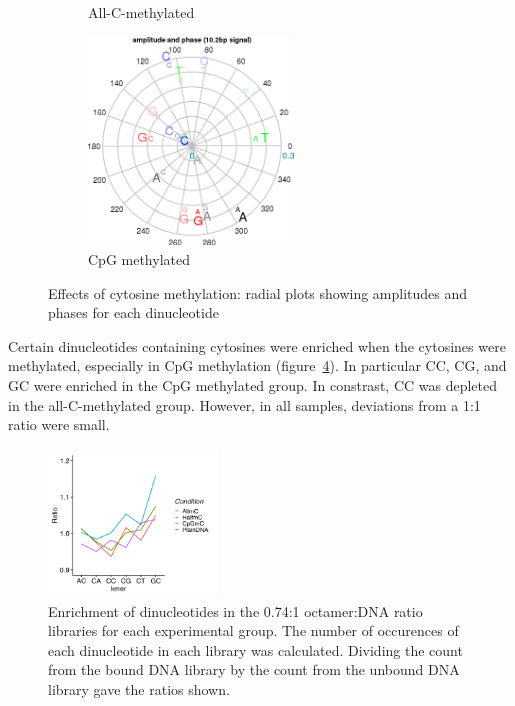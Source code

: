 \documentclass[parskip=full, numbers=noenddot]{scrreprt}
\begin{document}
\begin{figure}[htb]
\begin{subfigure}[htb]{0.6\textwidth}
    \caption{All-C-methylated}
    \label{fig:radial_mc_allmc}
  \end{subfigure}
  \begin{subfigure}[htb]{0.6\textwidth}
    \centering
    \includegraphics[width=0.6\textwidth]{emsa_h8_radial}
    \caption{CpG methylated}
    \label{fig:radial_mc_cpg}
  \end{subfigure}
  \caption{Effects of cytosine methylation: radial plots showing amplitudes and phases for each dinucleotide}
  \label{fig:radial_mc}
\end{figure}

Certain dinucleotides containing cytosines were enriched when the cytosines were methylated, especially in CpG methylation (figure~\ref{fig:c2nt}).  In particular CC, CG, and GC were enriched in the CpG methylated group.  In constrast, CC was depleted in the all-C-methylated group.  However, in all samples, deviations from a 1:1 ratio were small.

\begin{figure}[htb]
  \centering
  \includegraphics[width=0.4\textwidth]{c2nt}
  \caption{Enrichment of dinucleotides in the 0.74:1 octamer:DNA ratio libraries for each experimental group.  The number of occurences of each dinucleotide in each library was calculated.  Dividing the count from the bound DNA library by the count from the unbound DNA library gave the ratios shown.} 
  \label{fig:c2nt}
\end{figure}
\end{document}
